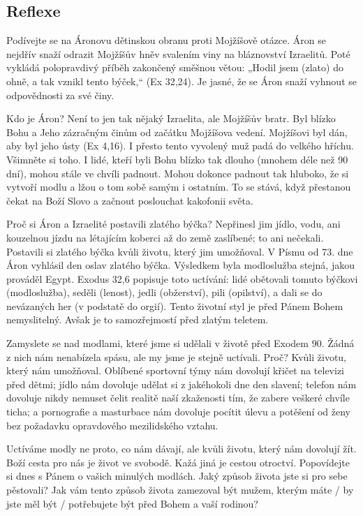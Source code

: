 \documentclass[11pt]{article}
\begin{document}
\subsection*{Reflexe}
Podívejte se na Áronovu dětinskou obranu proti Mojžíšově otázce. Áron se nejdřív snaží odrazit Mojžíšův hněv
svalením viny na bláznovství Izraelitů. Poté vykládá polopravdivý příběh zakončený směšnou větou: „Hodil jsem
(zlato) do ohně, a tak vznikl tento býček,“ (Ex 32,24). Je jasné, že se Áron snaží vyhnout se odpovědnosti za své činy.

Kdo je Áron? Není to jen tak nějaký Izraelita, ale Mojžíšův bratr. Byl blízko Bohu a Jeho zázračným činům od začátku
Mojžíšova vedení. Mojžíšovi byl dán, aby byl jeho ústy (Ex 4,16). I přesto tento vyvolený muž padá do velkého hříchu.
Všimněte si toho. I lidé, kteří byli Bohu blízko tak dlouho (mnohem déle než 90 dní), mohou stále ve chvíli padnout.
Mohou dokonce padnout tak hluboko, že si vytvoří modlu a lžou o tom sobě samým i ostatním. To se stává, když
přestanou čekat na Boží Slovo a začnout poslouchat kakofonii světa.

Proč si Áron a Izraelité postavili zlatého býčka? Nepřinesl jim jídlo, vodu, ani kouzelnou jízdu na létajícím koberci až
do země zaslíbené; to ani nečekali. Postavili si zlatého býčka kvůli životu, který jim umožňoval. V Písmu od 73. dne
Áron vyhlásil den oslav zlatého býčka. Výsledkem byla modloslužba stejná, jakou prováděl Egypt. Exodus 32,6
popisuje toto uctívání: lidé obětovali tomuto býčkovi (modloslužba), seděli (lenost), jedli (obžerství), pili (opilství), a
dali se do nevázaných her (v podstatě do orgií). Tento životní styl je před Pánem Bohem nemyslitelný. Avšak je to
samozřejmostí před zlatým teletem.

Zamyslete se nad modlami, které jsme si udělali v životě před Exodem 90. Žádná z nich nám nenabízela spásu, ale my
jsme je stejně uctívali. Proč? Kvůli životu, který nám umožňoval. Oblíbené sportovní týmy nám dovolují křičet na
televizi před dětmi; jídlo nám dovoluje udělat si z jakéhokoli dne den slavení; telefon nám dovoluje nikdy nemuset
čelit realitě naší zkaženosti tím, že zabere veškeré chvíle ticha; a pornografie a masturbace nám dovoluje pocítit úlevu
a potěšení od ženy bez požadavku opravdového mezilidského vztahu.

Uctíváme modly ne proto, co nám dávají, ale kvůli životu, který nám dovolují žít. Boží cesta pro nás je život ve
svobodě. Kažá jiná je cestou otroctví. Popovídejte si dnes s Pánem o vašich minulých modlách. Jaký způsob života jste
si pro sebe pěstovali? Jak vám tento způsob života zamezoval být mužem, kterým máte / by jste měl být / potřebujete
být před Bohem a vaší rodinou?
\end{document}

